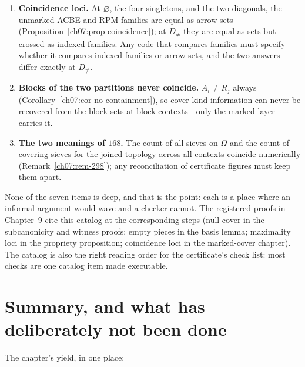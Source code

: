 \begin{enumerate}
\item \textbf{Coincidence loci.} At $\varnothing$, the four singletons, and the two diagonals, the unmarked ACBE and RPM families are equal as arrow sets (Proposition~\ref{ch07:prop-coincidence}); at $D_{\neq}$ they are equal as sets but crossed as indexed families. Any code that compares families must specify whether it compares indexed families or arrow sets, and the two answers differ exactly at $D_{\neq}$.
\item \textbf{Blocks of the two partitions never coincide.} $A_{i}\neq R_{j}$ always (Corollary~\ref{ch07:cor-no-containment}), so cover-kind information can never be recovered from the block sets at block contexts---only the marked layer carries it.
\item \textbf{The two meanings of $168$.} The count of all sieves on $\Omega$ and the count of covering sieves for the joined topology across all contexts coincide numerically (Remark~\ref{ch07:rem-298}); any reconciliation of certificate figures must keep them apart.
\end{enumerate}

\begin{remark}\label{ch07:rem-degenerate}
None of the seven items is deep, and that is the point: each is a place where an informal argument would wave and a checker cannot. The registered proofs in Chapter~9 cite this catalog at the corresponding steps (null cover in the subcanonicity and witness proofs; empty pieces in the basis lemma; maximality loci in the propriety proposition; coincidence loci in the marked-cover chapter). The catalog is also the right reading order for the certificate's check list: most checks are one catalog item made executable.
\end{remark}

\section{Summary, and what has deliberately not been done}\label{ch07:sec-summary}

The chapter's yield, in one place:


